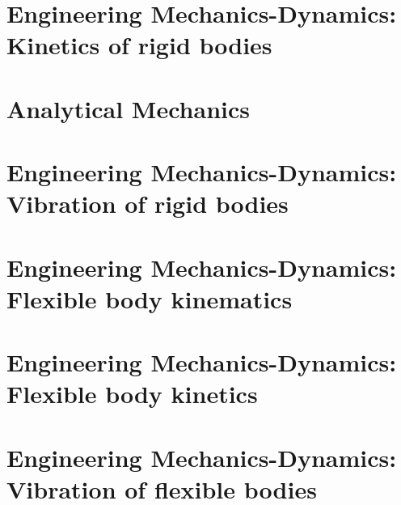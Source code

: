 \documentclass[]{book}
\begin{document}
\part{Engineering Mechanics-Dynamics: Kinetics of rigid bodies}
\part{Analytical Mechanics}
\part{Engineering Mechanics-Dynamics: Vibration of rigid bodies}
\part{Engineering Mechanics-Dynamics: Flexible body kinematics}
\part{Engineering Mechanics-Dynamics: Flexible body kinetics}
\part{Engineering Mechanics-Dynamics: Vibration of flexible bodies}
\appendix

\backmatter

\printindex
\end{document}
